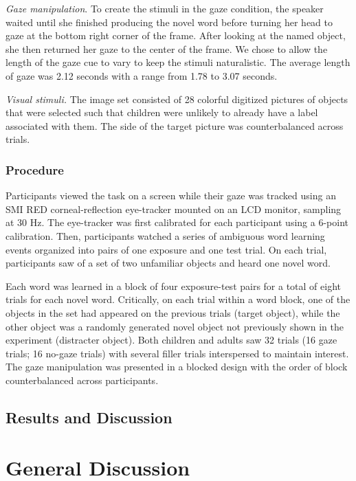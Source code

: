\documentclass[man,floatsintext]{apa6}
\begin{document}
\emph{Gaze manipulation}. To create the stimuli in the gaze condition,
the speaker waited until she finished producing the novel word before
turning her head to gaze at the bottom right corner of the frame. After
looking at the named object, she then returned her gaze to the center of
the frame. We chose to allow the length of the gaze cue to vary to keep
the stimuli naturalistic. The average length of gaze was 2.12 seconds
with a range from 1.78 to 3.07 seconds.

\emph{Visual stimuli.} The image set consisted of 28 colorful digitized
pictures of objects that were selected such that children were unlikely
to already have a label associated with them. The side of the target
picture was counterbalanced across trials.

\subsubsection{Procedure}\label{procedure-2}

Participants viewed the task on a screen while their gaze was tracked
using an SMI RED corneal-reflection eye-tracker mounted on an LCD
monitor, sampling at 30 Hz. The eye-tracker was first calibrated for
each participant using a 6-point calibration. Then, participants watched
a series of ambiguous word learning events organized into pairs of one
exposure and one test trial. On each trial, participants saw of a set of
two unfamiliar objects and heard one novel word.

Each word was learned in a block of four exposure-test pairs for a total
of eight trials for each novel word. Critically, on each trial within a
word block, one of the objects in the set had appeared on the previous
trials (target object), while the other object was a randomly generated
novel object not previously shown in the experiment (distracter object).
Both children and adults saw 32 trials (16 gaze trials; 16 no-gaze
trials) with several filler trials interspersed to maintain interest.
The gaze manipulation was presented in a blocked design with the order
of block counterbalanced across participants.

\subsection{Results and Discussion}\label{results-and-discussion-2}

\section{General Discussion}\label{general-discussion}
\end{document}
